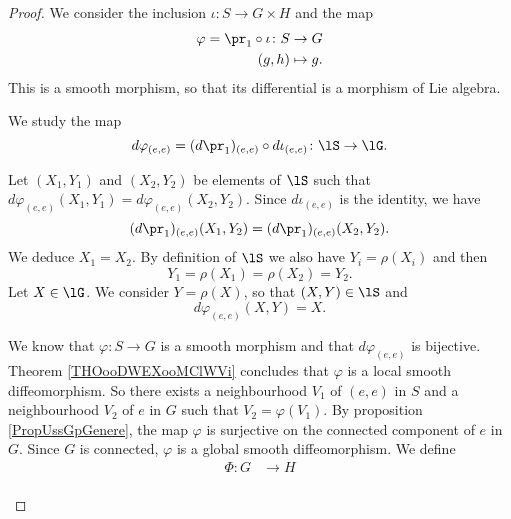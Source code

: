 \begin{proof}
	We consider the inclusion \( \iota\colon S\to G\times H\) and the map
	\begin{equation}
		\begin{aligned}
			\varphi=\pr_1\circ\iota\colon S & \to G      \\
			(g,h)                           & \mapsto g.
		\end{aligned}
	\end{equation}
	This is a smooth morphism, so that its differential is a morphism of Lie algebra.
	\begin{subproof}
		We study the map
		\begin{equation}
			d\varphi_{(e,e)}=(d\pr_1)_{(e,e)}\circ d\iota_{(e,e)}\colon \lS\to \lG.
		\end{equation}
		\begin{subproof}
			\spitem[Injection]
			Let \( (X_1,Y_1)\) and \( (X_2,Y_2)\) be elements of \( \lS\) such that \( d\varphi_{(e,e)}(X_1,Y_1)=d\varphi_{(e,e)}(X_2,Y_2)\). Since \( d\iota_{(e,e)}\) is the identity, we have
			\begin{equation}
				(d\pr_1)_{(e,e)}(X_1,Y_2)=(d\pr_1)_{(e,e)}(X_2,Y_2).
			\end{equation}
			We deduce \( X_1=X_2\). By definition of \( \lS\) we also have \( Y_i=\rho(X_i)\) and then
			\begin{equation}
				Y_1=\rho(X_1)=\rho(X_2)=Y_2.
			\end{equation}
			\spitem[Surjection]
			Let \( X\in\lG\). We consider \( Y=\rho(X)\), so that \( (X,Y)\in \lS\) and
			\begin{equation}
				d\varphi_{(e,e)}(X,Y)=X.
			\end{equation}
		\end{subproof}
		\spitem[Diffeomorphism]
		We know that \( \varphi\colon S\to G\) is a smooth morphism and that \( d\varphi_{(e,e)}\) is bijective. Theorem \ref{THOooDWEXooMClWVi} concludes that \( \varphi\) is a local smooth diffeomorphism. So there exists a neighbourhood \( V_1\) of \( (e,e)\) in \( S\) and a neighbourhood \( V_2\) of \( e\) in \( G\) such that \( V_2=\varphi(V_1)\). By proposition \ref{PropUssGpGenere}, the map \( \varphi\) is surjective on the connected component of \( e\) in \( G\). Since \( G\) is connected, \( \varphi\) is a global smooth diffeomorphism.
		We define
		\begin{equation}
			\begin{aligned}
				\Phi\colon G & \to H                     \\

\end{aligned}
\end{equation}
\end{subproof}
\end{proof}
